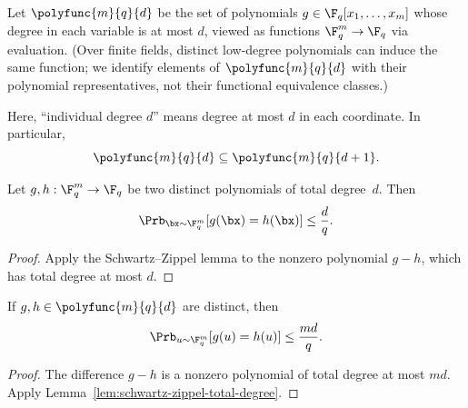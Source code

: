 \begin{definition}\label{def:polyfunc}
	\leanok
	Let $\polyfunc{m}{q}{d}$ be the set of polynomials $g \in \F_q[x_1,\dots,x_m]$ whose degree in each variable is at most $d$, viewed as functions $\F_q^m \to \F_q$ via evaluation. (Over finite fields, distinct low-degree polynomials can induce the same function; we identify elements of $\polyfunc{m}{q}{d}$ with their polynomial representatives, not their functional equivalence classes.)
\end{definition}

\begin{remark}\label{rem:individual-degree-convention}
	Here, ``individual degree $d$'' means degree at most $d$ in each coordinate. In
	particular,
	\[
		\polyfunc{m}{q}{d} \subseteq \polyfunc{m}{q}{d+1}.
	\]
\end{remark}

\begin{lemma}\label{lem:schwartz-zippel-total-degree}
	\leanok
	Let $g, h:\F_q^m \rightarrow \F_q$ be two distinct polynomials of total degree~$d$.
	Then
	\begin{equation*}
		\Prb_{\bx \sim \F_q^m}[g(\bx) = h(\bx)] \leq \frac{d}{q}.
	\end{equation*}
\end{lemma}
\begin{proof}
	\leanok
	Apply the Schwartz--Zippel lemma to the nonzero polynomial $g-h$, which has total degree at most $d$.
\end{proof}

\begin{lemma}\label{lem:schwartz-zippel-individual}
	\leanok
	If $g,h \in \polyfunc{m}{q}{d}$ are distinct, then
	\[
		\Prb_{u \sim \F_q^m}[g(u)=h(u)] \le \frac{md}{q}.
	\]
\end{lemma}
\begin{proof}
	\leanok
	The difference $g-h$ is a nonzero polynomial of total degree at most $md$. Apply Lemma~\ref{lem:schwartz-zippel-total-degree}.
\end{proof}

